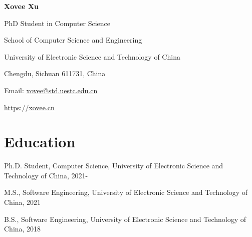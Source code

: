\documentclass[]{article}
\begin{document}
\begin{center}
    \Huge{
    \textbf{Xovee Xu}}
\end{center}
\vspace{10pt}



\setlength{\parskip}{1pt}

\noindent PhD Student in Computer Science

\noindent School of Computer Science and Engineering

\noindent University of Electronic Science and Technology of China

\noindent Chengdu, Sichuan 611731, China

\noindent Email: \href{mailto:xovee@std.uestc.edu.cn}{xovee@std.uestc.edu.cn}

\noindent \url{https://xovee.cn}

\setlength{\parskip}{3pt}

\vspace{-8pt}
\section*{Education}
\vspace{-4pt}
\indent 

Ph.D. Student, Computer Science, University of Electronic Science and Technology of China, 2021-

M.S., Software Engineering, University of Electronic Science and Technology of China, 2021

B.S., Software Engineering, University of Electronic Science and Technology of China, 2018






\end{document}

